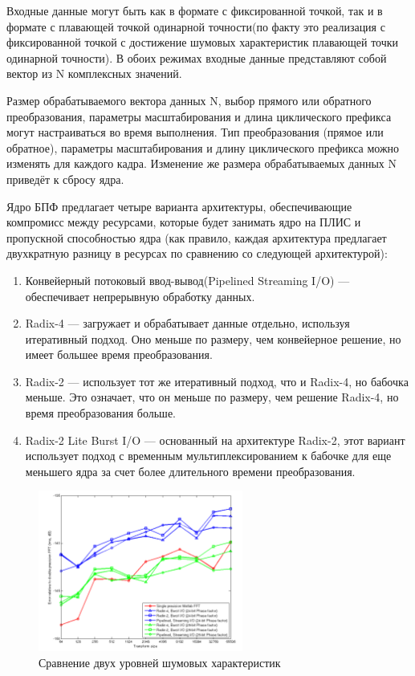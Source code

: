 Входные данные могут быть как в формате с фиксированной точкой, так и в формате с плавающей точкой одинарной точности(по факту это реализация с фиксированной точкой с достижение шумовых характеристик плавающей точки одинарной точности). В обоих режимах входные данные представляют собой вектор из N комплексных значений. 

Размер обрабатываемого вектора данных N, выбор прямого или обратного преобразования, параметры масштабирования и длина циклического префикса могут настраиваться во время выполнения. Тип преобразования (прямое или обратное), параметры масштабирования и длину циклического префикса можно изменять для каждого кадра. Изменение же размера обрабатываемых данных N приведёт к сбросу ядра. 

Ядро БПФ предлагает четыре варианта архитектуры, обеспечивающие компромисс между ресурсами, которые будет занимать ядро на ПЛИС и пропускной способностью ядра (как правило, каждая архитектура предлагает двухкратную разницу в ресурсах по сравнению со следующей архитектурой): 

\begin{enumerate}
	\item Конвейерный потоковый ввод-вывод(Pipelined Streaming I/O) — обеспечивает непрерывную обработку данных. 
	\item Radix-4 — загружает и обрабатывает данные отдельно, используя итеративный подход. Оно меньше по размеру, чем конвейерное решение, но имеет большее время преобразования. 
	\item Radix-2 — использует тот же итеративный подход, что и Radix-4, но бабочка меньше. Это означает, что он меньше по размеру, чем решение Radix-4, но время преобразования больше. 
	\item Radix-2 Lite Burst I/O — основанный на архитектуре Radix-2, этот вариант использует подход с временным мультиплексированием к бабочке для еще меньшего ядра за счет более длительного времени преобразования.
\end{enumerate} 

\begin{figure}[h]
	\centering
	\includegraphics[width=0.6\textwidth]{image/fft_xilinx_fp.png}
	\caption{Сравнение двух уровней шумовых характеристик}
	\label{fft_xilinx_fp}
\end{figure}

